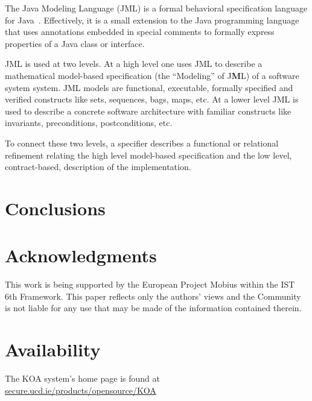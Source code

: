\documentclass{llncs}
\begin{document}
The Java Modeling Language (JML) is a formal behavioral specification
language for Java~\cite{LeavensBakerRuby99,LeavensBakerRuby-Prelim}.
Effectively, it is a small extension to the Java programming language
that uses annotations embedded in special comments to formally express
properties of a Java class or interface.

JML is used at two levels.  At a high level one uses JML to describe a
mathematical model-based specification (the ``Modeling'' of
J\textbf{M}L) of a software system system.  JML models are functional,
executable, formally specified and verified constructs like sets,
sequences, bags, maps, etc.  At a lower level JML is used to describe
a concrete software architecture with familiar constructs like
invariants, preconditions, postconditions, etc.

To connect these two levels, a specifier describes a functional or
relational refinement relating the high level model-based specification
and the low level, contract-based, description of the implementation.

 

 

\section{Conclusions}
\label{sec:conclusions}

 

\section{Acknowledgments}

This work is being supported by the European Project Mobius within the IST 6th
Framework. This paper reflects only the authors' views and the Community is 
not liable for any use that may be made of the information contained therein.

\section{Availability}

The KOA system's home page is found at
{\url{secure.ucd.ie/products/opensource/KOA}}

% 
{\footnotesize 
  
}


\end{document}
